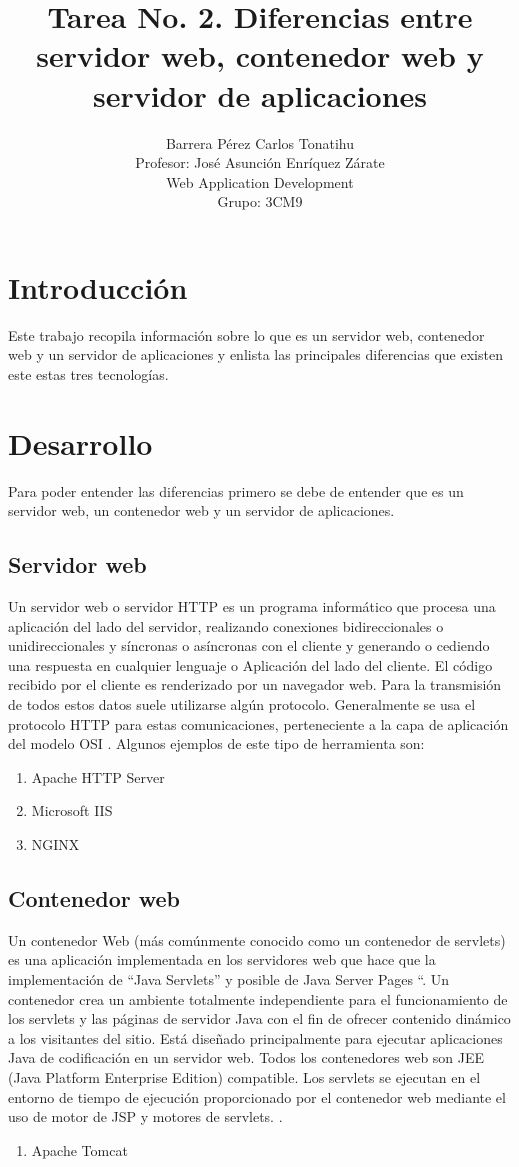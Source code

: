 \documentclass[a4paper,12pt]{article}
\title{Tarea No. 2. Diferencias entre servidor web, contenedor web y servidor de aplicaciones}
\author{Barrera Pérez Carlos Tonatihu \\ Profesor: José Asunción Enríquez Zárate \\ Web Application Development \\ Grupo: 3CM9 }
\begin{document}
\maketitle
\newpage
\tableofcontents

\newpage
\section{Introducción}
Este trabajo recopila información sobre lo que es un servidor web, contenedor web y un servidor de aplicaciones y enlista las principales diferencias que existen este estas tres tecnologías.

\section{Desarrollo}
Para poder entender las diferencias primero se debe de entender que es un servidor web, un contenedor web y un servidor de aplicaciones.
\subsection{Servidor web}
Un servidor web o servidor HTTP es un programa informático que procesa una aplicación del lado del servidor, realizando conexiones bidireccionales o unidireccionales y síncronas o asíncronas con el cliente y generando o cediendo una respuesta en cualquier lenguaje o Aplicación del lado del cliente. El código recibido por el cliente es renderizado por un navegador web. Para la transmisión de todos estos datos suele utilizarse algún protocolo. Generalmente se usa el protocolo HTTP para estas comunicaciones, perteneciente a la capa de aplicación del modelo OSI \cite{wiki}.
Algunos ejemplos de este tipo de herramienta son:
\begin{enumerate}
 \item Apache HTTP Server
 \item Microsoft IIS
 \item NGINX
\end{enumerate}

\subsection{Contenedor web}
Un contenedor Web (más comúnmente conocido como un contenedor de servlets) es una aplicación implementada en los servidores web que hace que la implementación de “Java Servlets” y posible de Java Server Pages “. Un contenedor crea un ambiente totalmente independiente para el funcionamiento de los servlets y las páginas de servidor Java con el fin de ofrecer contenido dinámico a los visitantes del sitio. Está diseñado principalmente para ejecutar aplicaciones Java de codificación en un servidor web. Todos los contenedores web son JEE (Java Platform Enterprise Edition) compatible. Los servlets se ejecutan en el entorno de tiempo de ejecución proporcionado por el contenedor web mediante el uso de motor de JSP y motores de servlets. \cite{jee}.
\begin{enumerate}
 \item Apache Tomcat
\end{enumerate}
\end{document}
